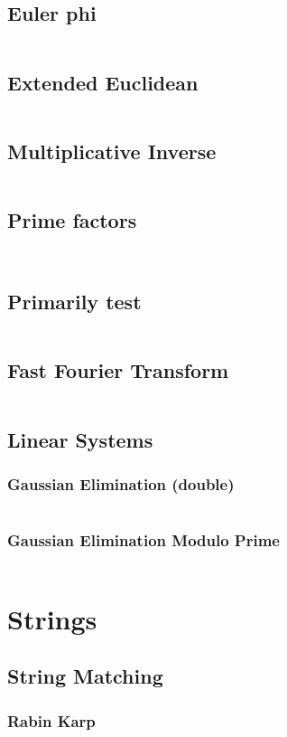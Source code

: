 \documentclass[a4paper, 10pt, twocolumn, landscape]{article}
\begin{document}
  \subsection{Euler phi}
  \inputminted{cpp}{math/euler-phi.cpp}
  \subsection{Extended Euclidean}
  \inputminted{cpp}{math/extended-euclid.cpp}
  \subsection{Multiplicative Inverse}
  \inputminted{cpp}{math/mult-inverse.cpp}
  \subsection{Prime factors}
  \inputminted{cpp}{math/prime-factors.cpp}
  \inputminted{cpp}{math/pollard-rho.cpp}
  \subsection{Primarily test}
  \inputminted{cpp}{math/miller-rabin.cpp}
  \subsection{Fast Fourier Transform}
  \inputminted{cpp}{math/fft.cpp}
  \subsection{Linear Systems}
  \subsubsection{Gaussian Elimination (double)}
  \inputminted{cpp}{math/gauss-elim.cpp}
  \subsubsection{Gaussian Elimination Modulo Prime}
  \inputminted{cpp}{math/gauss-elim-prime.cpp}

  
  \section{Strings}
  \subsection{String Matching}
  \subsubsection{Rabin Karp}
  \inputminted{cpp}{strings/rabin-karp.cpp}
\end{document}
